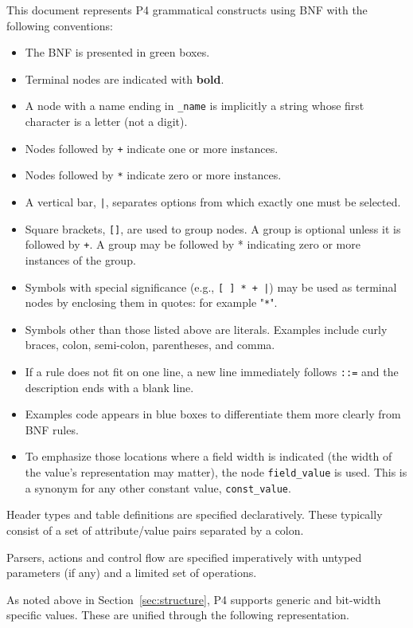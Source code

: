\documentclass[12pt]{article}
\begin{document}
This document represents P4 grammatical constructs using BNF with the
following conventions:

\begin{itemize}
\item
The BNF is presented in green boxes.
\item
Terminal nodes are indicated with \textbf{bold}.
\item
A node with a name ending in \texttt{_name} is implicitly a string whose first character 
is a letter (not a digit).
\item
Nodes followed by \texttt{+} indicate one or more instances.
\item
Nodes followed by \texttt{*} indicate zero or more instances.
\item
A vertical bar, \texttt{|}, separates options from which exactly one must be selected.
\item
Square brackets, \texttt{[]}, are used to group nodes. A group is optional unless 
it is followed by \texttt{+}. A group may be followed by * indicating zero or more 
instances of the group.
\item
Symbols with special significance (e.g., \texttt{[ ] * + |}) may be used as terminal 
nodes by enclosing them in quotes: for example "\texttt{*}".
\item
Symbols other than those listed above are literals. Examples include curly 
braces, colon, semi-colon, parentheses, and comma.
\item
If a rule does not fit on one line, a new line immediately follows \texttt{::=} and 
the description ends with a blank line.
\item
Examples code appears in blue boxes to differentiate them more clearly
from BNF rules.
\item
To emphasize those locations where a field width is indicated (the width of 
the value's representation may matter), the node \texttt{field_value} is used. This 
is a synonym for any other constant value, \texttt{const_value}.
\end{itemize}

Header types and table definitions are specified declaratively.  These
typically consist of a set of attribute/value pairs separated by a
colon.

Parsers, actions and control flow are specified imperatively with
untyped parameters (if any) and a limited set of operations.


As noted above in Section~\ref{sec:structure}, P4 supports 
generic and bit-width specific values. These are unified through the following 
representation.
\end{document}
